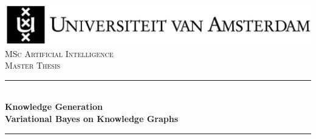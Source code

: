 \documentclass{article}
\begin{document}
\begin{titlepage}

\newcommand{\HRule}{\rule{\linewidth}{0.5mm}} %

\center %

 






\includegraphics[width=\linewidth]{data/images/uvaENG}\\[2.5cm]

\textsc{\Large MSc Artificial Intelligence}\\[0.2cm]

\textsc{\Large Master Thesis}\\[0.5cm] 








\HRule \\[0.4cm]

{ \huge \bfseries Knowledge Generation \\ \Large Variational Bayes on Knowledge Graphs \\ [0.4cm] } %

\HRule \\[0.5cm]

 







\end{titlepage}
\end{document}

